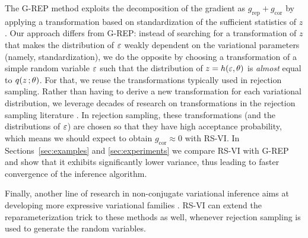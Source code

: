 The \gls{G-REP} method \citep{RuizTB2016} exploits the decomposition of the gradient as $g_{\text{rep}}+g_{\text{cor}}$ by applying a transformation based on standardization of the sufficient statistics of $z$. Our approach differs from \gls{G-REP}: instead of searching for a transformation of $z$ that makes the distribution of $\varepsilon$ weakly dependent on the variational parameters (namely, standardization), we do the opposite by choosing a transformation of a simple random variable $\varepsilon$ such that the distribution of $z=h(\varepsilon,\theta)$ is \emph{almost} equal to $q(z\, ;\theta)$. For that, we reuse the transformations typically used in rejection sampling. Rather than having to derive a new transformation for each variational distribution, we leverage decades of research on transformations in the rejection sampling literature \citep{devroye1986}. In rejection sampling, these transformations (and the distributions of $\varepsilon$) are chosen so that they have high acceptance probability, which means we should expect to obtain $g_{\text{cor}}\approx 0$ with \gls{RS-VI}. In Sections~\ref{sec:examples} and \ref{sec:experiments} we compare \gls{RS-VI} with \gls{G-REP} and show that it exhibits significantly lower variance, thus leading to faster convergence of the inference algorithm.

Finally, another line of research in non-conjugate variational inference aims at developing more expressive variational families \citep{Salimans2015,Tran2016,Maaloe2016,Ranganath2016}. \gls{RS-VI} can extend the reparameterization trick to these methods as well, whenever rejection sampling is used to generate the random variables.

